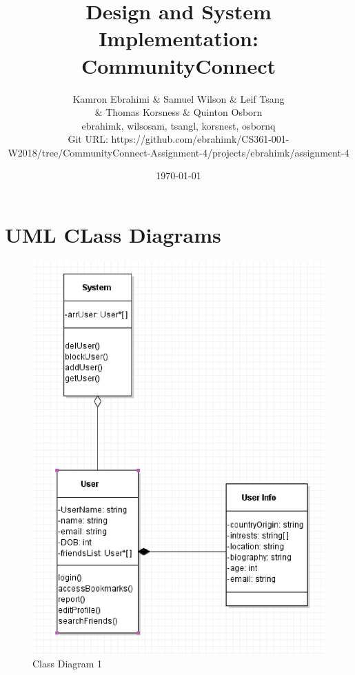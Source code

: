 \documentclass[12pt]{article}
\title{Design and System Implementation: CommunityConnect}
\author{Kamron Ebrahimi \& Samuel Wilson \& Leif Tsang \\ \& Thomas Korsness  \& Quinton Osborn \\ ebrahimk, wilsosam, tsangl, korsnest, osbornq \\ \scriptsize{Git URL: https://github.com/ebrahimk/CS361-001-W2018/tree/CommunityConnect-Assignment-4/projects/ebrahimk/assignment-4}}
\date{\today}
\begin{document}
\maketitle

\tableofcontents

\section{\bf UML CLass Diagrams}

        \begin{figure}[H]
                \includegraphics[width =\linewidth,scale=0.5]{classDiagram.eps}
                \caption{Class Diagram 1}
                \label{fig: Class Diagram 1}
        \end{figure}
\end{document}

